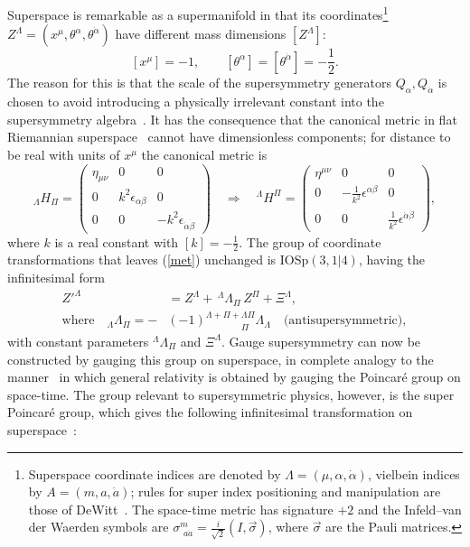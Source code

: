 \documentclass[a4paper,12pt]{article}
\newcommand{\al}{\ensuremath{\alpha}}
\newcommand{\be}{\ensuremath{\beta}}
\newcommand{\La}{\ensuremath{\Lambda}}
\newcommand{\si}{\ensuremath{\sigma}}
\newcommand{\te}{\ensuremath{\theta}}
\newcommand{\ep}{\ensuremath{\epsilon}}
\newcommand{\sfrac}[2]{\ensuremath{{\scriptstyle \frac{#1}{#2}}}}
\begin{document}
Superspace is remarkable as a supermanifold in that its coordinates\footnote{Superspace coordinate indices are denoted by $\La=(\mu,\al,\dot{\al})$, vielbein indices by $A=(m,a,\dot{a})$; rules for super index positioning and manipulation are those of DeWitt~\cite{dew}. The space-time metric has signature $+2$ and the Infeld--van der Waerden symbols are $\si^{m}_{\ \,a\dot{a}}=\sfrac{i}{\sqrt{2}}(I,\vec{\si})$, where $\vec{\si}$ are the Pauli matrices.}
$Z^\La=(x^\mu,\te^\al,\te^{\dot{\al}})$ have different mass dimensions $[Z^\La]$:
\begin{equation} \label{coord}
[x^\mu]=-1, \qquad [\te^\al]=[\te^{\dot{\al}}]=-\sfrac{1}{2}.
\end{equation}
The reason for this is that the scale of the supersymmetry generators $Q_\al,Q_{\dot{\al}}$ is chosen to avoid introducing a physically irrelevant constant into the supersymmetry algebra~\cite{wes2}. It has the consequence that the canonical metric in flat Riemannian superspace~\cite{dew} cannot have dimensionless components; for distance to be real with units of $x^\mu$ the canonical metric is
\begin{equation} \label{met}
_\La H_\Pi=\left(\begin{array}{ccc} \eta_{\mu\nu} & 0 & 0 \\
0 & k^2\ep_{\al\be} & 0 \\
0 & 0 & -k^2\ep_{\dot{\al}\dot{\be}} \end{array}\right) \quad
\Rightarrow \quad ^\La H^\Pi=\left(\begin{array}{ccc} \eta^{\mu\nu} & 0 & 0 \\
0 & -\frac{1}{k^2}\ep^{\al\be} & 0 \\
0 & 0 & \frac{1}{k^2}\ep^{\dot{\al}\dot{\be}} \end{array}\right),
\end{equation}
where $k$ is a real constant with $[k]=-\sfrac{1}{2}$. The group of coordinate transformations that leaves (\ref{met}) unchanged is IOSp$(3,1|4)$, having the infinitesimal form
\begin{equation} \label{iosp}
\begin{split}
{Z'}^\La& =Z^\La+\,^\La\!\La_\Pi\,Z^\Pi+\Xi^\La, \\
\text{where} \quad _\La\La_\Pi =-&(-1)^{\La+\Pi+\La\Pi}_{\qquad\qquad\!\!\Pi}\La_\La \quad\text{(antisupersymmetric)},
\end{split}
\end{equation} 
with constant parameters $^\La\!\La_\Pi$ and $\Xi^\La$. Gauge supersymmetry can now be constructed by gauging this group on superspace, in complete analogy to the manner~\cite{gri,sal} in which general relativity is obtained by gauging the Poincar\'{e} group on space-time. The group relevant to supersymmetric physics, however, is the super Poincar\'{e} group, which gives the following infinitesimal transformation on superspace~\cite{wes2}:
\end{document}
